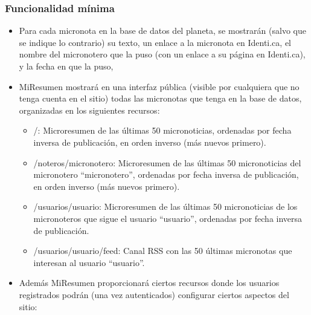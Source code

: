 \subsubsection{Funcionalidad mínima}

\begin{itemize}
\item Para cada micronota en la base de datos del planeta, se mostrarán (salvo que se indique lo contrario) su texto, un enlace a la micronota en Identi.ca, el nombre del micronotero que la puso (con un enlace a su página en Identi.ca), y la fecha en que la puso, 
\item MiResumen mostrará en una interfaz pública (visible por cualquiera que no tenga cuenta en el sitio) todas las micronotas que tenga en la base de datos, organizadas en los siguientes recursos:

  \begin{itemize}
  \item /: Microresumen de las últimas 50 micronoticias, ordenadas por fecha inversa de publicación, en orden inverso (más nuevos primero).
  \item /noteros/micronotero: Microresumen de las últimas 50 micronoticias del micronotero ``micronotero'', ordenadas por fecha inversa de publicación, en orden inverso (más nuevos primero).
  \item /usuarios/usuario: Microresumen de las últimas 50 micronoticias de los micronoteros que sigue el usuario ``usuario'', ordenadas por fecha inversa de publicación.
  \item /usuarios/usuario/feed: Canal RSS  con las 50 últimas micronotas que interesan al usuario ``usuario''.
  \end{itemize}

\item Además MiResumen proporcionará ciertos recursos donde los usuarios registrados podrán (una vez autenticados) configurar ciertos aspectos del sitio:


\end{itemize}
